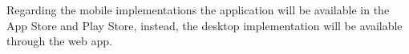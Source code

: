 Regarding the mobile implementations the application will be available in the App Store and Play Store, instead, the desktop implementation will be available through the web app.